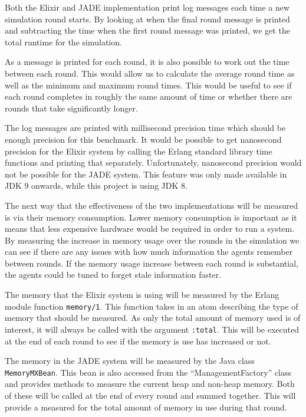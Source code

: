 Both the Elixir and JADE implementation print log messages each time a new simulation round starts.
By looking at when the final round message is printed and subtracting the time when the first round message was printed, we get the total runtime for the simulation.

As a message is printed for each round, it is also possible to work out the time between each round.
This would allow us to calculate the average round time as well as the minimum and maximum round times.
This would be useful to see if each round completes in roughly the same amount of time or whether there are rounds that take significantly longer.

The log messages are printed with millisecond precision time which should be enough precision for this benchmark.
It would be possible to get nanosecond precision for the Elixir system by calling the Erlang standard library time functions and printing that separately.
Unfortunately, nanosecond precision would not be possible for the JADE system.
This feature was only made available in JDK 9 onwards, while this project is using JDK 8.

The next way that the effectiveness of the two implementations will be measured is via their memory consumption.
Lower memory consumption is important as it means that less expensive hardware would be required in order to run a system.
By measuring the increase in memory usage over the rounds in the simulation we can see if there are any issues with how much information the agents remember between rounds.
If the memory usage increase between each round is substantial, the agents could be tuned to forget stale information faster.

The memory that the Elixir system is using will be measured by the Erlang module function \verb|memory/1|.
This function takes in an atom describing the type of memory that should be measured.
As only the total amount of memory used is of interest, it will always be called with the argument \verb|:total|.
This will be executed at the end of each round to see if the memory is use has increased or not.

The memory in the JADE system will be measured by the Java class \\ \verb|MemoryMXBean|.
This bean is also accessed from the ``ManagementFactory'' class and provides methods to measure the current heap and non-heap memory.
Both of these will be called at the end of every round and summed together.
This will provide a measured for the total amount of memory in use during that round.

